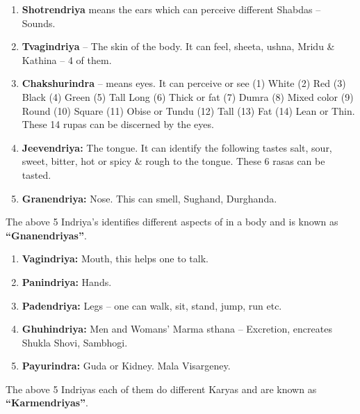 \begin{enumerate}
\item \textbf{Shotrendriya} means the ears which can perceive different Shabdas – Sounds.

 \item \textbf{Tvagindriya} – The skin of the body. It can feel, sheeta, ushna, Mridu \& Kathina – 4 of them.

 \item \textbf{Chakshurindra} – means eyes. It can perceive or see (1) White (2) Red (3) Black (4) Green (5) Tall Long (6) Thick or fat (7) Dumra (8) Mixed color (9) Round (10) Square (11) Obise or Tundu (12) Tall (13) Fat (14) Lean or Thin. These 14 rupas can be discerned by the eyes.

 \item \textbf{Jeevendriya:} The tongue. It can identify the following tastes salt, sour, sweet, bitter, hot or spicy \& rough to the tongue. These 6 rasas can be tasted.

 \item \textbf{Granendriya:} Nose. This can smell, Sughand, Durghanda.

\end{enumerate}

The above 5 Indriya's identifies different aspects of in a body and is known as \textbf{“Gnanendriyas”}.

\begin{enumerate}
\item \textbf{Vagindriya:} Mouth, this helps one to talk.

 \item \textbf{Panindriya:} Hands.

 \item \textbf{Padendriya:} Legs – one can walk, sit, stand, jump, run etc.

 \item \textbf{Ghuhindriya:} Men and Womans' Marma sthana – Excretion, encreates Shukla Shovi, Sambhogi.

 \item \textbf{Payurindra:} Guda or Kidney. Mala Visargeney.

\end{enumerate}

The above 5 Indriyas each of them do different Karyas and are known as \textbf{“Karmendriyas”}.

